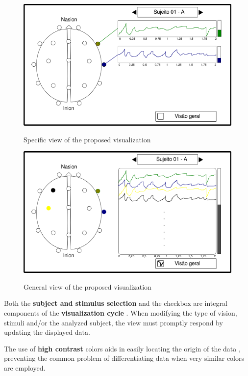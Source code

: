 \documentclass[format=sigconf]{acmart}
\begin{document}
		\begin{figure}[h]
			\centering
			\caption{Specific view of the proposed visualization}
			\includegraphics[width=\linewidth]{../presentation/images/g3714}
			\label{fig:g3714}
		\end{figure}
		
		\begin{figure}[h]
			\centering
			\caption{General view of the proposed visualization}
			\includegraphics[width=\linewidth]{../presentation/images/g3762}
			\label{fig:g3762}
		\end{figure}
	
		\par Both the \textbf{subject and stimulus selection} and the checkbox are integral components of the \textbf{visualization cycle} \cite{munzner2014visualization}. When modifying the type of vision, stimuli and/or the analyzed subject, the view must promptly respond by updating the displayed data.\newline
		
		\par The use of \textbf{high contrast} colors aids in easily locating the origin of the data \cite{spence2014information}, preventing the common problem of differentiating data when very similar colors are employed.\newline
		
\end{document}
